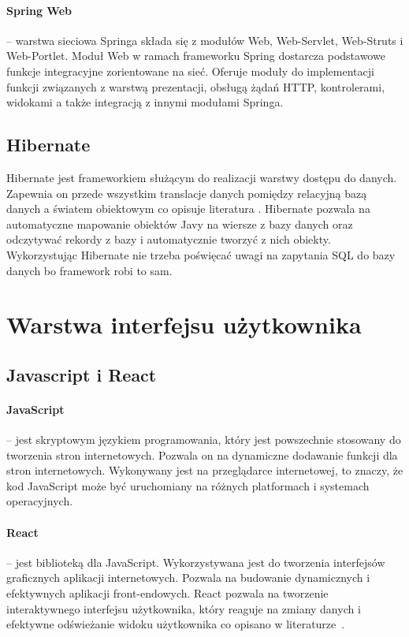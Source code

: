 \paragraph{Spring Web} -- warstwa sieciowa Springa składa się z modułów Web, Web-Servlet, Web-Struts i Web-Portlet. Moduł Web w ramach frameworku Spring dostarcza podstawowe funkcje integracyjne zorientowane na sieć. Oferuje moduły do implementacji funkcji związanych z warstwą prezentacji, obsługą żądań HTTP, kontrolerami, widokami a także integracją z innymi modułami Springa. 


\subsection{Hibernate}
\label{hibernate:label}
Hibernate jest frameworkiem służącym do realizacji warstwy dostępu do danych. Zapewnia on przede wszystkim translacje danych pomiędzy relacyjną bazą danych a światem obiektowym co opisuje literatura \cite{javapersistence}. Hibernate pozwala na automatyczne mapowanie obiektów Javy na wiersze z bazy danych oraz odczytywać rekordy z bazy i automatycznie tworzyć z nich obiekty. Wykorzystując Hibernate nie trzeba poświęcać uwagi na zapytania SQL do bazy danych bo framework robi to sam.


\section{Warstwa interfejsu użytkownika}

\subsection{Javascript i React}
\paragraph{JavaScript} -- jest skryptowym językiem programowania, który jest powszechnie stosowany do tworzenia stron internetowych. Pozwala on na dynamiczne dodawanie funkcji dla stron internetowych. Wykonywany jest na przeglądarce internetowej, to znaczy, że kod JavaScript może być uruchomiany na różnych platformach i systemach operacyjnych. 

\paragraph{React} -- jest biblioteką dla JavaScript. Wykorzystywana jest do tworzenia interfejsów graficznych aplikacji internetowych. Pozwala na budowanie dynamicznych i efektywnych aplikacji front-endowych. React  pozwala na tworzenie interaktywnego interfejsu użytkownika, który reaguje na zmiany danych i efektywne odświeżanie widoku użytkownika co opisano w literaturze~\cite{react}. 

